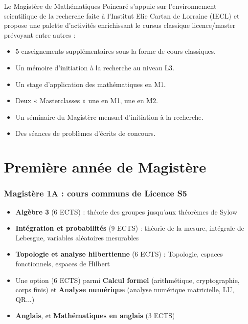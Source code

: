 \documentclass[slidetop,11pt]{beamer}
\begin{document}
\begin{frame}
Le Magistère de Mathématiques Poincaré s'appuie sur l'environnement scientifique de la recherche faite à l'Institut Elie Cartan de Lorraine (IECL) et propose une palette d'activités enrichissant le cursus classique licence/master prévoyant entre autres :
\begin{itemize}
\item 5 enseignements supplémentaires sous la forme de cours classiques.
\item Un mémoire d'initiation à la recherche au niveau L3.
\item Un stage d'application des mathématiques en M1.
\item Deux « Masterclasses » une en M1, une en M2.
\item Un séminaire du Magistère mensuel d'initiation à la recherche.
\item Des séances de problèmes d'écrits de concours.
\end{itemize}

\end{frame}


 
 \section{Première année de Magistère}
\begin{frame}
\frametitle{Magistère 1A : cours communs de Licence S5}
\begin{itemize}
\item \textbf{Algèbre 3} (6 ECTS) : théorie des groupes jusqu'aux théorèmes de Sylow
\item \textbf{Intégration et probabilités} (9 ECTS) : théorie de la mesure, intégrale de Lebesgue, variables aléatoires mesurables
\item \textbf{Topologie et analyse hilbertienne} (6 ECTS) : Topologie, espaces fonctionnels, espaces de Hilbert
\item Une option (6 ECTS) parmi \textbf{Calcul formel} (arithmétique, cryptographie, corps finis) et \textbf{Analyse numérique} (analyse numérique matricielle, LU, QR...)
\item \textbf{Anglais}, et \textbf{Mathématiques en anglais} (3 ECTS)
\end{itemize}

\end{frame}
\end{document}

